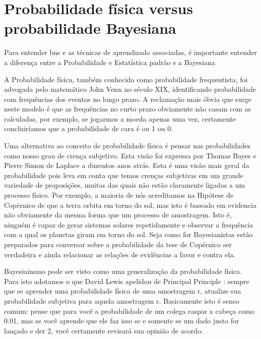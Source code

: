 \section{Probabilidade física versus probabilidade Bayesiana}
Para entender \glspl{bn} e as técnicas de aprendizado associadas, é importante entender a diferença entre a Probabilidade e Estatística padrão e a Bayesiana \cite{korb04}


A Probabilidade física, também conhecida como probabilidade frequentista, foi advogada pelo matemático John Venn \cite{venn66} no século XIX, identificando probabilidade com frequências dos eventos no longo prazo. A reclamação mais óbvia que surge neste modelo é que as frequências no curto prazo obviamente não casam com as calculadas, por exemplo, se jogarmos a moeda apenas uma vez, certamente concluiríamos que a probabilidade de cara é ou 1 ou 0.

Uma alternativa ao conceito de probabilidade física é pensar nas probabilidades como nosso grau de crença subjetivo. Esta visão foi expressa por Thomas Bayes \cite{bayes63} e Pierre Simon de Laplace \cite{laplace12} a duzentos anos atrás. Esta é uma visão mais geral da probabilidade pois leva em conta que temos crenças subjetivas em um grande variedade de proposições, muitas das quais não estão claramente ligadas a um processo físico.  Por exemplo, a maioria de nós acreditamos na Hipótese de Copérnico de que a terra orbita em torno do sol, mas isto é baseado em evidencia não obviamente da mesma forma que um processo de amostragem. Isto é, ninguém é capaz de gerar sistemas solares repetidamente e observar a frequência com a qual os planetas giram em torno do sol. Seja como for Bayesianistas estão preparados para conversar sobre a probabilidade da tese de Copérnico ser verdadeira e ainda relacionar as relações de evidências a favor e contra ela. 

Bayesiainsmo pode ser visto como uma generalização da probabilidade física. Para isto adotamos o que David Lewis apelidou de Principal Principle \cite{lewis80}: sempre que se aprender uma probabilidade física de uma amostragem r, atualize sua probabilidade subjetiva para aquela amostragem r. Basicamente isto é senso comum: pense que para você a  probabilidade de um colega raspar a cabeça como 0.01, mas se você aprende que ele faz isso se e somente se um dado justo for lançado e der 2, você certamente revisará sua opinião de acordo.

